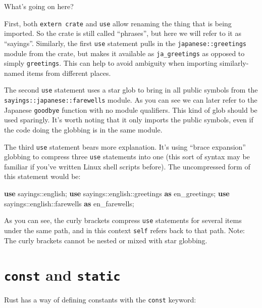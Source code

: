 \documentclass[a4paper,]{book}
\renewcommand*{\hypertarget}[3][\ar]{%
  \def\ar{#2}%
  \label{#1}%
  #3}
\newenvironment{Shaded}{\begin{snugshade}}{\end{snugshade}}
\newcommand{\KeywordTok}[1]{\textcolor[rgb]{0.13,0.29,0.53}{\textbf{{#1}}}}
\newcommand{\NormalTok}[1]{{#1}}
\begin{document}
What's going on here?

First, both \texttt{extern\ crate} and \texttt{use} allow renaming the
thing that is being imported. So the crate is still called ``phrases'',
but here we will refer to it as ``sayings''. Similarly, the first
\texttt{use} statement pulls in the \texttt{japanese::greetings} module
from the crate, but makes it available as \texttt{ja\_greetings} as
opposed to simply \texttt{greetings}. This can help to avoid ambiguity
when importing similarly-named items from different places.

The second \texttt{use} statement uses a star glob to bring in all
public symbols from the \texttt{sayings::japanese::farewells} module. As
you can see we can later refer to the Japanese \texttt{goodbye} function
with no module qualifiers. This kind of glob should be used sparingly.
It's worth noting that it only imports the public symbols, even if the
code doing the globbing is in the same module.

The third \texttt{use} statement bears more explanation. It's using
``brace expansion'' globbing to compress three \texttt{use} statements
into one (this sort of syntax may be familiar if you've written Linux
shell scripts before). The uncompressed form of this statement would be:

\begin{Shaded}
\begin{Highlighting}[]
\KeywordTok{use} \NormalTok{sayings::english;}
\KeywordTok{use} \NormalTok{sayings::english::greetings }\KeywordTok{as} \NormalTok{en_greetings;}
\KeywordTok{use} \NormalTok{sayings::english::farewells }\KeywordTok{as} \NormalTok{en_farewells;}
\end{Highlighting}
\end{Shaded}

As you can see, the curly brackets compress \texttt{use} statements for
several items under the same path, and in this context \texttt{self}
refers back to that path. Note: The curly brackets cannot be nested or
mixed with star globbing.

\hypertarget{sec--const-and-static}{\section{\texorpdfstring{\texttt{const}
and \texttt{static}}{const and static}}\label{sec--const-and-static}}

Rust has a way of defining constants with the \texttt{const} keyword:
\end{document}
